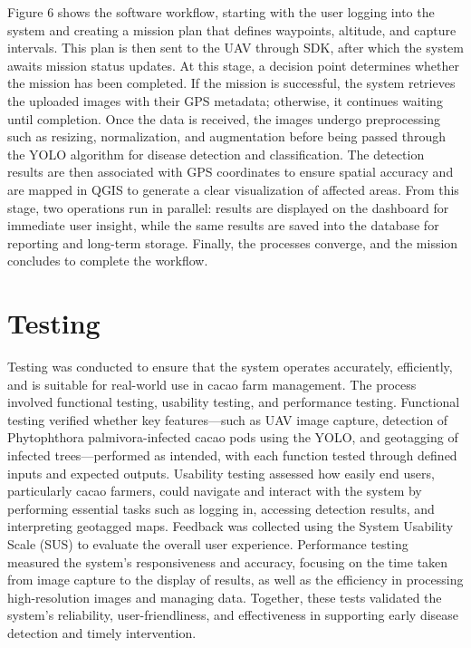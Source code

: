 Figure 6 shows the software workflow, starting with the user logging into the system and creating a mission plan that defines waypoints, altitude, and capture intervals. This plan is then sent to the UAV through SDK, after which the system awaits mission status updates. At this stage, a decision point determines whether the mission has been completed. If the mission is successful, the system retrieves the uploaded images with their GPS metadata; otherwise, it continues waiting until completion. Once the data is received, the images undergo preprocessing such as resizing, normalization, and augmentation before being passed through the YOLO algorithm for disease detection and classification. The detection results are then associated with GPS coordinates to ensure spatial accuracy and are mapped in QGIS to generate a clear visualization of affected areas. From this stage, two operations run in parallel: results are displayed on the dashboard for immediate user insight, while the same results are saved into the database for reporting and long-term storage. Finally, the processes converge, and the mission concludes to complete the workflow.

\section{Testing}
Testing was conducted to ensure that the system operates accurately, efficiently, and is suitable for real-world use in cacao farm management. The process involved functional testing, usability testing, and performance testing. Functional testing verified whether key features—such as UAV image capture, detection of Phytophthora palmivora-infected cacao pods using the YOLO, and geotagging of infected trees—performed as intended, with each function tested through defined inputs and expected outputs. Usability testing assessed how easily end users, particularly cacao farmers, could navigate and interact with the system by performing essential tasks such as logging in, accessing detection results, and interpreting geotagged maps. Feedback was collected using the System Usability Scale (SUS) to evaluate the overall user experience. Performance testing measured the system’s responsiveness and accuracy, focusing on the time taken from image capture to the display of results, as well as the efficiency in processing high-resolution images and managing data. Together, these tests validated the system’s reliability, user-friendliness, and effectiveness in supporting early disease detection and timely intervention.

